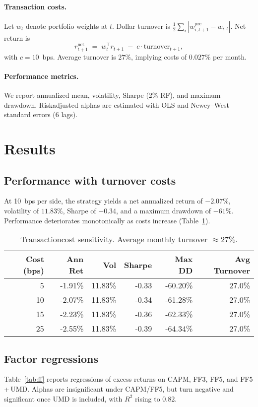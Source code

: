 \documentclass[11pt]{article}
\begin{document}
\paragraph{Transaction costs.}
Let \(w_t\) denote portfolio weights at \(t\). Dollar turnover is \(\tfrac{1}{2}\sum_i |w_{i,t+1}^{\text{pre}} - w_{i,t}|\). Net return is
\[
r^{\text{net}}_{t+1} \;=\; w_t^\top r_{t+1} \;-\; c \cdot \text{turnover}_{t+1},
\]
with \(c{=}10\)~bps. Average turnover is \(27\%\), implying costs of \(0.027\%\) per month.

\paragraph{Performance metrics.}
We report annualized mean, volatility, Sharpe (2\% RF), and maximum drawdown. Risk\textendash adjusted alphas are estimated with OLS and Newey--West standard errors (6 lags).

\section{Results} \label{sec:results}
\subsection{Performance with turnover costs}
At 10~bps per side, the strategy yields a net annualized return of \(-2.07\%\), volatility of \(11.83\%\), Sharpe of \(-0.34\), and a maximum drawdown of \(-61\%\). Performance deteriorates monotonically as costs increase (Table~\ref{tab:tc}).

\begin{table}[!ht]
\centering
\caption{Transaction\textendash cost sensitivity. Average monthly turnover $\approx 27\%$.}
\label{tab:tc}
\begin{tabular}{rrrrrr}
\toprule
Cost (bps) & Ann Ret & Vol & Sharpe & Max DD & Avg Turnover \\
\midrule
\phantom{0}5  & -1.91\% & 11.83\% & -0.33 & -60.20\% & 27.0\% \\
10 & -2.07\% & 11.83\% & -0.34 & -61.28\% & 27.0\% \\
15 & -2.23\% & 11.83\% & -0.36 & -62.33\% & 27.0\% \\
25 & -2.55\% & 11.83\% & -0.39 & -64.34\% & 27.0\% \\
\bottomrule
\end{tabular}
\end{table}

\subsection{Factor regressions}
Table~\ref{tab:ff} reports regressions of excess returns on CAPM, FF3, FF5, and FF5\,+\,UMD. Alphas are insignificant under CAPM/FF5, but turn negative and significant once UMD is included, with \(R^2\) rising to 0.82.
\end{document}
